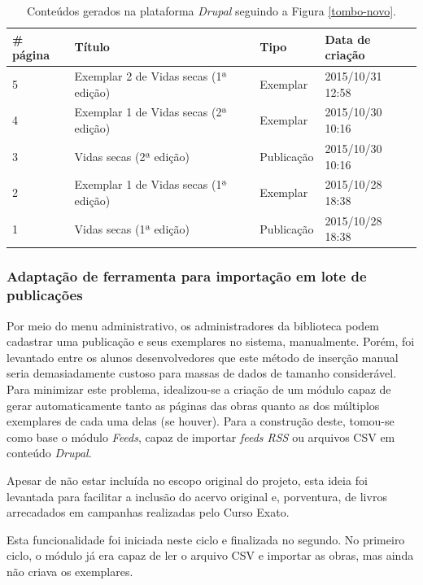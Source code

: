 \documentclass[a4paper]{article}
\begin{document}
\begin{table}[hc]
\centering
\caption{Conteúdos gerados na plataforma \textit{Drupal} seguindo a Figura \ref{tombo-novo}.\label{tabela-tombo-novo}}
\begin{tabular}{llll}
\hline
\# página & Título                                & Tipo       & Data de criação  \\ \hline
5         & Exemplar 2 de Vidas secas (1ª edição) & Exemplar   & 2015/10/31 12:58 \\ \hline
4         & Exemplar 1 de Vidas secas (2ª edição) & Exemplar   & 2015/10/30 10:16 \\ \hline
3         & Vidas secas (2ª edição)               & Publicação & 2015/10/30 10:16 \\ \hline
2         & Exemplar 1 de Vidas secas (1ª edição) & Exemplar   & 2015/10/28 18:38 \\ \hline
1         & Vidas secas (1ª edição)               & Publicação & 2015/10/28 18:38 \\ \hline
\end{tabular}
\end{table}


\subsubsection{Adaptação de ferramenta para importação em lote de publicações}
Por meio do menu administrativo, os administradores da biblioteca podem cadastrar uma publicação e seus exemplares no sistema, manualmente. Porém, foi levantado entre os alunos desenvolvedores que este método de inserção manual seria demasiadamente custoso para massas de dados de tamanho considerável. Para minimizar este problema, idealizou-se a criação de um módulo capaz de gerar automaticamente tanto as páginas das obras quanto as dos múltiplos exemplares de cada uma delas (se houver). Para a construção deste, tomou-se como base o módulo \textit{Feeds}, capaz de importar \textit{feeds RSS} ou arquivos CSV em conteúdo \textit{Drupal}.

Apesar de não estar incluída no escopo original do projeto, esta ideia foi levantada para facilitar a inclusão do acervo original e, porventura, de livros arrecadados em campanhas realizadas pelo Curso Exato.

Esta funcionalidade foi iniciada neste ciclo e finalizada no segundo. No primeiro ciclo, o módulo já era capaz de ler o arquivo CSV e importar as obras, mas ainda não criava os exemplares.
\end{document}
